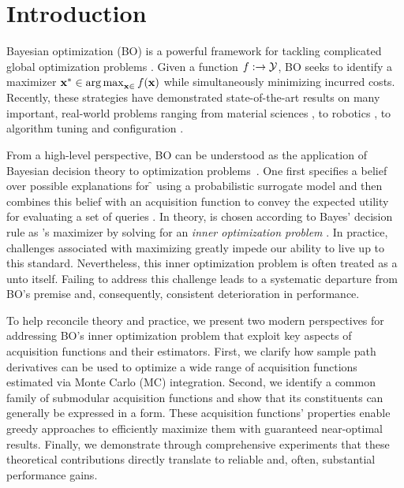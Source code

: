 
\section{Introduction}
\label{sect:introduction}

Bayesian optimization (BO) is a powerful framework for tackling complicated global optimization problems \cite{kushner1964new,movckus1975bayesian,jones-jgo98a}. Given a \blackbox{} function \(f :  \to \mathcal{Y}\), BO seeks to identify a maximizer \(\opt{\x} \in \argmax_{\x \in \xspace} \f(\x)\) while simultaneously minimizing incurred costs. Recently, these strategies have demonstrated state-of-the-art results on many important, real-world problems ranging from material sciences \cite{frazier2016bayesian,ueno2016combo}, to robotics \cite{calandra2016bayesian,bansal2017goal}, to algorithm tuning and configuration \cite{hutter2011sequential,snoek-nips12a,swersky-nips13,falkner-icml-18}.


From a high-level perspective, BO can be understood as the application of Bayesian decision theory to optimization problems~\cite{movckus1994application, degroot2005optimal,robert2007bayesian}. One first specifies a belief over possible explanations for \f{} using a probabilistic surrogate model and then combines this belief with an acquisition function \Acq{} to convey the expected utility for evaluating a set of queries \X{}. 
% 
In theory, \X{} is chosen according to Bayes' decision rule as \Acq{}'s maximizer by solving for an \emph{inner optimization problem} \cite{gelbart2014bayesian,martinez2014bayesopt,wang2016parallel}. 
% 
In practice, challenges associated with maximizing \Acq{} greatly impede our ability to live up to this standard.
% 
Nevertheless, this inner optimization problem is often treated as a \blackbox{} unto itself. 
%
Failing to address this challenge leads to a systematic departure from BO's premise and, consequently, consistent deterioration in  performance.


To help reconcile theory and practice, we present two modern perspectives for addressing BO's inner optimization problem that exploit key aspects of acquisition functions and their estimators.
% 
First, we clarify how sample path derivatives can be used to optimize a wide range of acquisition functions estimated via Monte Carlo (MC) integration.
% 
Second, we identify a common family of submodular acquisition functions and show that its constituents can generally be expressed in a  form. These acquisition functions' properties enable greedy approaches to efficiently maximize them with guaranteed near-optimal results.
% 
Finally, we demonstrate through comprehensive experiments that these theoretical contributions directly translate to reliable and, often, substantial performance gains. 
